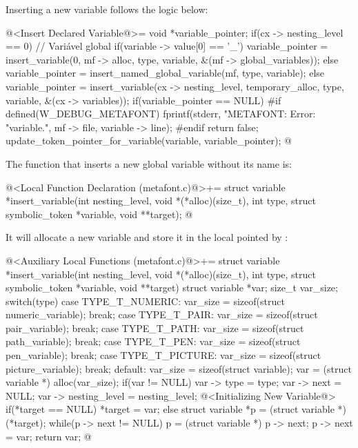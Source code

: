 Inserting a new variable follows the logic below:

\iniciocodigo
@<Insert Declared Variable@>=
{
  void *variable_pointer;
  if(cx -> nesting_level == 0){ // Variável global
    if(variable -> value[0] == '_')
      variable_pointer = insert_variable(0, mf -> alloc, type, variable,
                                         &(mf -> global_variables));
    else
      variable_pointer = insert_named_global_variable(mf, type, variable);
  }
  else
    variable_pointer = insert_variable(cx -> nesting_level,
                                      temporary_alloc, type,
                                      variable, &(cx -> variables));
  if(variable_pointer == NULL){
#if defined(W_DEBUG_METAFONT)
      fprintf(stderr, "METAFONT: Error: %
                    "variable.\n", mf -> file, variable -> line);
#endif
    return false;
  }
  update_token_pointer_for_variable(variable, variable_pointer);
}
@
\fimcodigo

The function that inserts a new global variable without its name is:

\iniciocodigo
@<Local Function Declaration (metafont.c)@>+=
struct variable *insert_variable(int nesting_level,
                                 void *(*alloc)(size_t),
                                 int type,
                                 struct symbolic_token *variable,
                                 void **target);
@
\fimcodigo

It will allocate a new variable and store it in the local pointed
by :

\iniciocodigo
@<Auxiliary Local Functions (metafont.c)@>+=
struct variable *insert_variable(int nesting_level,
                                 void *(*alloc)(size_t),
                                 int type,
                                 struct symbolic_token *variable,
                                 void **target){
  struct variable *var;
  size_t var_size;
  switch(type){
    case TYPE_T_NUMERIC:
      var_size = sizeof(struct numeric_variable);
      break;
    case TYPE_T_PAIR:
      var_size = sizeof(struct pair_variable);
      break;
    case TYPE_T_PATH:
      var_size = sizeof(struct path_variable);
      break;
    case TYPE_T_PEN:
      var_size = sizeof(struct pen_variable);
      break;
    case TYPE_T_PICTURE:
      var_size = sizeof(struct picture_variable);
      break;
    default:
      var_size = sizeof(struct variable);
  }
  var = (struct variable *) alloc(var_size);
  if(var != NULL){
    var -> type = type;
    var -> next = NULL;
    var -> nesting_level = nesting_level;
    @<Initializing New Variable@>
  }
  if(*target == NULL)
    *target = var;
  else{
    struct variable *p = (struct variable *) (*target);
    while(p -> next != NULL)
      p = (struct variable *) p -> next;
    p -> next = var;
  }
  return var;
}
@
\fimcodigo

